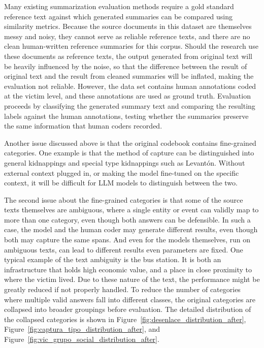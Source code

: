 \documentclass{article}
\begin{document}
Many existing summarization evaluation methods require a gold standard reference text against which generated summaries can be compared using similarity metrics. Because the source documents in this dataset are themselves messy and noisy, they cannot serve as reliable reference texts, and there are no clean human-written reference summaries for this corpus. Should the research use these documents as reference texts, the output generated from original text will be heavily influenced by the noise, so that the difference between the result of original text and the result from cleaned summaries will be inflated, making the evaluation not reliable. However, the data set contains human annotations coded at the victim level, and these annotations are used as ground truth. Evaluation proceeds by classifying the generated summary text and comparing the resulting labels against the human annotations, testing whether the summaries preserve the same information that human coders recorded. 

Another issue discussed above is that the original codebook contains fine-grained categories. One example is that the method of capture can be distinguished into general kidnappings and special type kidnappings such as Levantón. Without external context plugged in, or making the model fine-tuned on the specific context, it will be difficult for LLM models to distinguish between the two.

The second issue about the fine-grained categories is that some of the source texts themselves are ambiguous, where a single entity or event can validly map to more than one category, even though both answers can be defensible. In such a case, the model and the human coder may generate different results, even though both may capture the same spans. And even for the models themselves, run on ambiguous texts, can lead to different results even parameters are fixed. One typical example of the text ambiguity is the bus station. It is both an infrastructure that holds high economic value, and a place in close proximity to where the victim lived. Due to these nature of the text, the performance might be greatly reduced if not properly handled. To reduce the number of categories where multiple valid answers fall into different classes, the original categories are collapsed into broader groupings before evaluation. The detailed distribution of the collapsed categories is shown in Figure~\ref{fig:desenlace_distribution_after}, Figure~\ref{fig:captura_tipo_distribution_after}, and Figure~\ref{fig:vic_grupo_social_distribution_after}.
\end{document}
